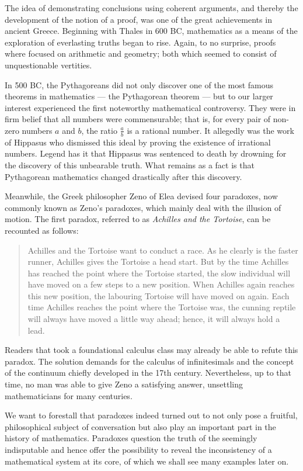 \documentclass[hidelinks]{article}
\def\righttriangle{
\scalebox{0.7}{
\begin{picture}(5,0)
\hspace{-0.2em}
\put(0,0){\line(1,0){10}}
\put(10,0){\line(-1,1){10}}
\put(0,0){\line(0,1){10}}
\end{picture}
}
}
\begin{document}
The idea of demonstrating conclusions using coherent arguments, and thereby the development of the notion of a proof, was one of the great achievements in ancient Greece.
Beginning with Thales in 600 BC, mathematics as a means of the exploration of everlasting truths began to rise. Again, to no surprise, proofs where focused on arithmetic and geometry; both which seemed to consist of unquestionable vertities.

In 500 BC, the Pythagoreans did not only discover one of the most famous theorems in mathematics --- the Pythagorean theorem\righttriangle --- but to our larger interest experienced the first noteworthy mathematical controversy. They were in firm belief that all numbers were commensurable; that is, for every pair of non-zero numbers $a$ and $b$, the ratio $\frac{a}{b}$ is a rational number. It allegedly was the work of Hippasus who dismissed this ideal by proving the existence of irrational numbers. Legend has it that Hippasus was sentenced to death by drowning for the discovery of this unbearable truth. What remains as a fact is that Pythagorean mathematics changed drastically after this discovery.

Meanwhile, the Greek philosopher Zeno of Elea devised four paradoxes, now commonly known as Zeno's paradoxes, which mainly deal with the illusion of motion. The first paradox, referred to as \textit{Achilles and the Tortoise}, can be recounted as follows:
\begin{quote}\label{zeno_paradox}
Achilles and the Tortoise want to conduct a race. As he clearly is the faster runner, Achilles gives the Tortoise a head start. But by the time Achilles has reached the point where the Tortoise started, the slow individual will have moved on a few steps to a new position. When Achilles again reaches this new position, the labouring Tortoise will have moved on again. Each time Achilles reaches the point where the Tortoise was, the cunning reptile will always have moved a little way ahead; hence, it will always hold a lead.
\end{quote}
Readers that took a foundational calculus class may already be able to refute this paradox. The solution demands for the calculus of infinitesimals and the concept of the continuum chiefly developed in the 17th century. Nevertheless, up to that time, no man was able to give Zeno a satisfying answer, unsettling mathematicians for many centuries.

We want to forestall that paradoxes indeed turned out to not only pose a fruitful, philosophical subject of conversation but also play an important part in the history of mathematics. Paradoxes question the truth of the seemingly indisputable and hence offer the possibility to reveal the inconsistency of a mathematical system at its core, of which we shall see many examples later on.
\end{document}

